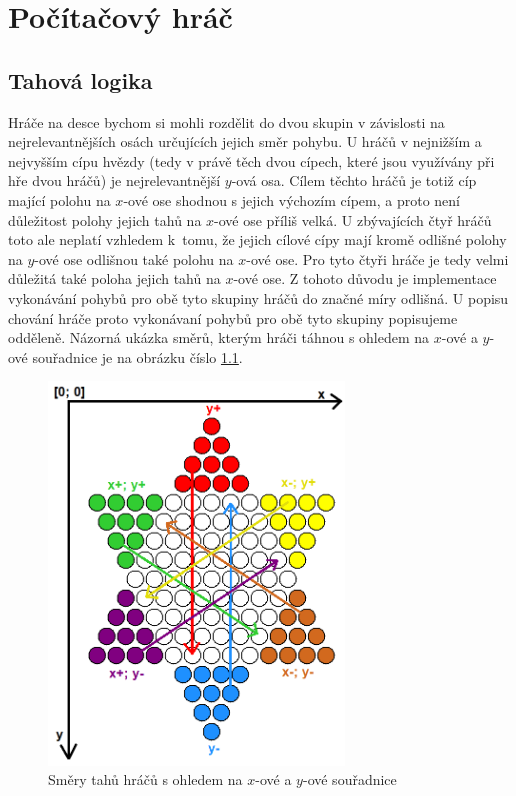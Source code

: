 \chapter{Počítačový hráč}
\section{Tahová logika}
Hráče na desce bychom si mohli rozdělit do dvou skupin v závislosti na nejrelevantnějších osách určujících jejich směr pohybu. U hráčů v nejnižším a nejvyšším cípu hvězdy (tedy v právě těch dvou cípech, které jsou využívány při hře dvou hráčů) je nejrelevantnější $y$-ová osa. Cílem těchto hráčů je totiž cíp mající polohu na $x$-ové ose shodnou s jejich výchozím cípem, a proto není důležitost polohy jejich tahů na $x$-ové ose příliš velká. U zbývajících čtyř hráčů toto ale neplatí vzhledem k~tomu, že jejich cílové cípy mají kromě odlišné polohy na $y$-ové ose odlišnou také polohu na $x$-ové ose. Pro tyto čtyři hráče je tedy velmi důležitá také poloha jejich tahů na $x$-ové ose. Z tohoto důvodu je implementace vykonávání pohybů pro obě tyto skupiny hráčů do značné míry odlišná. U popisu chování hráče proto vykonávaní pohybů pro obě tyto skupiny popisujeme odděleně. Názorná ukázka směrů, kterým hráči táhnou s ohledem na $x$-ové a $y$-ové souřadnice je na obrázku číslo \ref{fig:SmeryTahu}.

\begin{figure}
	\centering
	\includegraphics[width=0.7\textwidth]{Figures/SmeryTahu.png}
	\caption{Směry tahů hráčů s ohledem na $x$-ové a $y$-ové souřadnice}
    \label{fig:SmeryTahu}
\end{figure}

